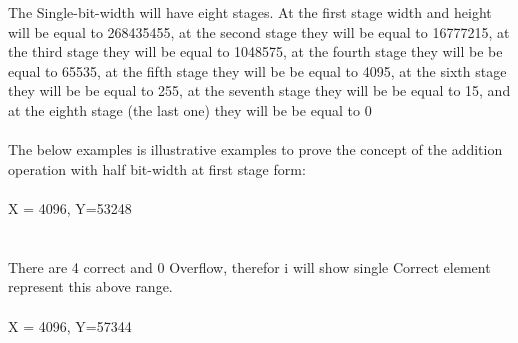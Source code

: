 \documentclass[11pt]{article}
\begin{document}
The Single-bit-width will have eight stages. At the first stage width and height will be equal to 268435455, at the second stage they will be equal to 16777215, at the third stage they will be equal to 1048575, at the fourth stage they will be be equal to 65535, at the fifth stage they will be be equal to 4095, at the sixth stage they will be be equal to 255, at the seventh stage they will be be equal to 15, and at the eighth stage (the last one) they will be be equal to 0\\\\
The below examples is illustrative examples to prove the concept of the addition operation with half bit-width at first stage form:\\\\
X = 4096, Y=53248\\
\\\\
There are 4 correct and 0 Overflow, therefor i will show single Correct element represent this above range.\\\\
X = 4096, Y=57344\\
\\\\
\end{document}
